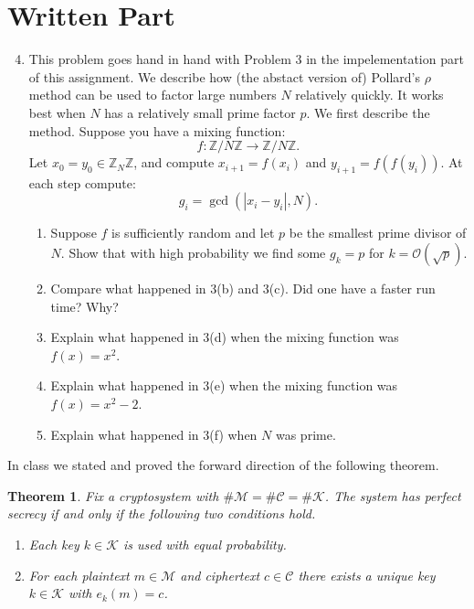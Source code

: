 \documentclass[11pt]{article}
\newtheorem{theorem}{Theorem}
\newcommand{\bZ}{\mathbb{Z}}
\newcommand{\cC}{\mathcal{C}}
\newcommand{\cK}{\mathcal{K}}
\newcommand{\cM}{\mathcal{M}}
\newcommand{\cO}{\mathcal{O}}
\begin{document}
\section*{Written Part}
\begin{enumerate}
  \setcounter{enumi}{3}
  \item{
  This problem goes hand in hand with Problem 3 in the impelementation part of this assignment.  We describe how (the abstact version of) Pollard's $\rho$ method can be used to factor large numbers $N$ relatively quickly.  It works best when $N$ has a relatively small prime factor $p$.  We first describe the method.  Suppose you have a mixing function:
  \[f:\bZ/N\bZ\to\bZ/N\bZ.\]
  Let $x_0=y_0\in\bZ_N\bZ$, and compute $x_{i+1} = f(x_i)$ and $y_{i+1} = f(f(y_i))$.  At each step compute:
  \[g_i = \gcd(|x_i-y_i|,N).\]
  \begin{enumerate}
    \item{
    Suppose $f$ is sufficiently random and let $p$ be the smallest prime divisor of $N$.  Show that with high probability we find some $g_k = p$ for $k=\cO(\sqrt{p})$.
    }
    \item{
    Compare what happened in 3(b) and 3(c).  Did one have a faster run time?  Why?
    }
    \item{
    Explain what happened in 3(d) when the mixing function was $f(x) = x^2$.
    }
    \item{
    Explain what happened in 3(e) when the mixing function was $f(x) = x^2-2$.
    }
    \item{
    Explain what happened in 3(f) when $N$ was prime.
    }
  \end{enumerate}
  }
\end{enumerate}
In class we stated and proved the forward direction of the following theorem.
\begin{theorem}\label{secrecy}
  Fix a cryptosystem with $\#\cM = \#\cC = \#\cK$.  The system has perfect secrecy if and only if the following two conditions hold.
  \begin{enumerate}[(1)]
    \item{
    Each key $k\in\cK$ is used with equal probability.
    }
    \item{
    For each plaintext $m\in\cM$ and ciphertext $c\in\cC$ there exists a unique key $k\in\cK$ with $e_k(m) = c$.
    }
  \end{enumerate}
\end{theorem}
\end{document}
